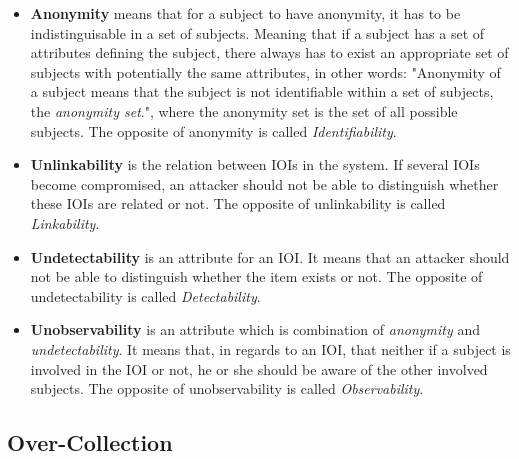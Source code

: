 \begin{itemize}
\setlength\itemsep{1em}
\item[] \textbf{Anonymity} means that for a subject to have anonymity, it has to be indistinguisable in a set of subjects. Meaning that if a subject has a set of attributes defining the subject, there always has to exist an appropriate set of subjects with potentially the same attributes, in other words: "Anonymity of a subject means that the subject is not identifiable within a set of subjects, the \textit{anonymity set}.", where the anonymity set is the set of all possible subjects. The opposite of anonymity is called \textit{Identifiability}. 

\item[] \textbf{Unlinkability} is the relation between IOIs in the system. If several IOIs become compromised, an attacker should not be able to distinguish whether these IOIs are related or not. The opposite of unlinkability is called \textit{Linkability}.

\item[] \textbf{Undetectability} is an attribute for an IOI. It means that an attacker should not be able to distinguish whether the item exists or not. The opposite of undetectability is called \textit{Detectability}.

\item[] \textbf{Unobservability} is an attribute which is combination of \textit{anonymity} and \textit{undetectability}. It means that, in regards to an IOI, that neither if a subject is involved in the IOI or not, he or she should be aware of the other involved subjects. The opposite of unobservability is called \textit{Observability}.
\end{itemize}



\subsection{Over-Collection}


